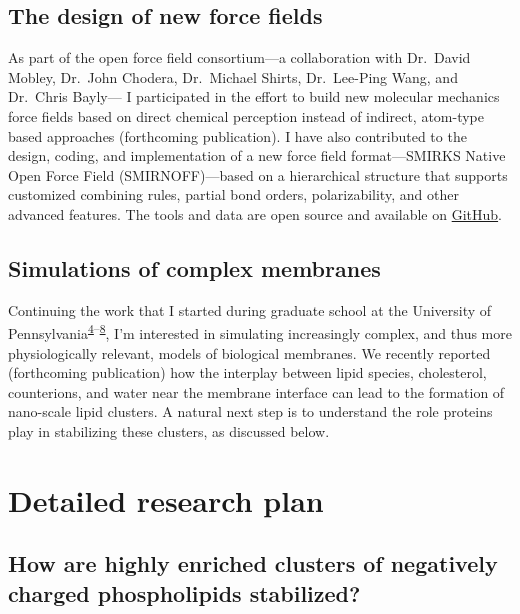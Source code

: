 \documentclass[11pt,notitlepage]{article}
\begin{document}
\hypertarget{the-design-of-new-force-fields}{%
\subsection{The design of new force
fields}\label{the-design-of-new-force-fields}}

As part of the open force field consortium---a collaboration with
Dr.~David Mobley, Dr.~John Chodera, Dr.~Michael Shirts, Dr.~Lee-Ping
Wang, and Dr.~Chris Bayly--- I participated in the effort to build new
molecular mechanics force fields based on direct chemical perception
instead of indirect, atom-type based approaches (forthcoming
publication). I have also contributed to the design, coding, and
implementation of a new force field format---SMIRKS Native Open Force
Field (SMIRNOFF)---based on a hierarchical structure that supports
customized combining rules, partial bond orders, polarizability, and
other advanced features. The tools and data are open source and
available on \href{https://github.com/openforcefield}{GitHub}.

\hypertarget{simulations-of-complex-membranes}{%
\subsection{Simulations of complex
membranes}\label{simulations-of-complex-membranes}}

Continuing the work that I started during graduate school at the
University of
Pennsylvania\textsuperscript{\protect\hyperlink{ref-1G0A01ZNq}{4}--\protect\hyperlink{ref-1AHXI1BtY}{8}},
I'm interested in simulating increasingly complex, and thus more
physiologically relevant, models of biological membranes. We recently
reported (forthcoming publication) how the interplay between lipid
species, cholesterol, counterions, and water near the membrane interface
can lead to the formation of nano-scale lipid clusters. A natural next
step is to understand the role proteins play in stabilizing these
clusters, as discussed below.

\hypertarget{detailed-research-plan}{%
\section{Detailed research plan}\label{detailed-research-plan}}

\hypertarget{how-are-highly-enriched-clusters-of-negatively-charged-phospholipids-stabilized}{%
\subsection{How are highly enriched clusters of negatively charged
phospholipids
stabilized?}\label{how-are-highly-enriched-clusters-of-negatively-charged-phospholipids-stabilized}}
\end{document}
